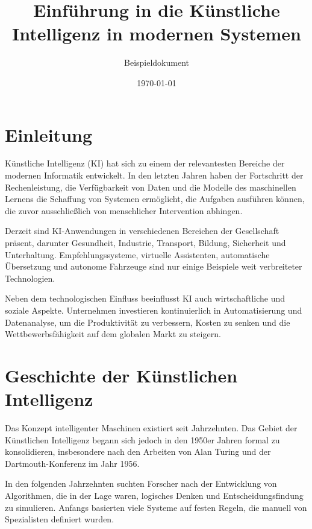 \documentclass[11pt]{article}
\begin{document}
\title{Einführung in die Künstliche Intelligenz in modernen Systemen}
\author{Beispieldokument}
\date{\today}
 
\maketitle

\tableofcontents
   
\newpage  

\section{Einleitung}

Künstliche Intelligenz (KI) hat sich zu einem der relevantesten Bereiche der modernen Informatik entwickelt.
In den letzten Jahren haben der Fortschritt der Rechenleistung, die Verfügbarkeit von Daten und die Modelle
des maschinellen Lernens die Schaffung von Systemen ermöglicht, die Aufgaben ausführen können, die
zuvor ausschließlich von menschlicher Intervention abhingen.

Derzeit sind KI-Anwendungen in verschiedenen Bereichen der Gesellschaft präsent, darunter Gesundheit,
Industrie, Transport, Bildung, Sicherheit und Unterhaltung. Empfehlungssysteme,
virtuelle Assistenten, automatische Übersetzung und autonome Fahrzeuge sind nur einige Beispiele
weit verbreiteter Technologien.

Neben dem technologischen Einfluss beeinflusst KI auch wirtschaftliche und soziale Aspekte. Unternehmen
investieren kontinuierlich in Automatisierung und Datenanalyse, um die Produktivität zu verbessern,
Kosten zu senken und die Wettbewerbsfähigkeit auf dem globalen Markt zu steigern. 

\section{Geschichte der Künstlichen Intelligenz}

Das Konzept intelligenter Maschinen existiert seit Jahrzehnten. Das Gebiet der Künstlichen
Intelligenz begann sich jedoch in den 1950er Jahren formal zu konsolidieren, insbesondere nach den
Arbeiten von Alan Turing und der Dartmouth-Konferenz im Jahr 1956.

In den folgenden Jahrzehnten suchten Forscher nach der Entwicklung von Algorithmen, die in der Lage waren,
logisches Denken und Entscheidungsfindung zu simulieren. Anfangs basierten viele Systeme auf
festen Regeln, die manuell von Spezialisten definiert wurden.
\end{document}
